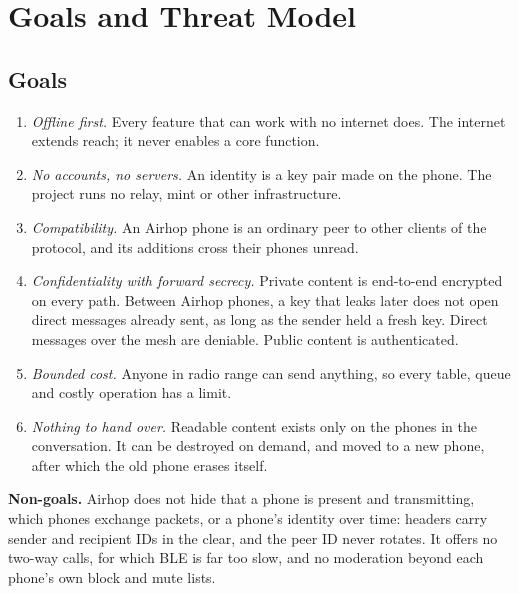 \documentclass[conference]{IEEEtran}
\begin{document}
\section{Goals and Threat Model}
\label{sec:goals}

\subsection{Goals}
{\renewcommand{\labelenumi}{G\arabic{enumi}.}
\begin{enumerate}
\item \emph{Offline first.} Every feature that can work with no internet does. The internet extends reach; it never enables a core function.
\item \emph{No accounts, no servers.} An identity is a key pair made on the phone. The project runs no relay, mint or other infrastructure.
\item \emph{Compatibility.} An Airhop phone is an ordinary peer to other clients of the protocol, and its additions cross their phones unread.
\item \emph{Confidentiality with forward secrecy.} Private content is end-to-end encrypted on every path. Between Airhop phones, a key that leaks later does not open direct messages already sent, as long as the sender held a fresh key. Direct messages over the mesh are deniable. Public content is authenticated.
\item \emph{Bounded cost.} Anyone in radio range can send anything, so every table, queue and costly operation has a limit.
\item \emph{Nothing to hand over.} Readable content exists only on the phones in the conversation. It can be destroyed on demand, and moved to a new phone, after which the old phone erases itself.
\end{enumerate}}

\textbf{Non-goals.} Airhop does not hide that a phone is present and transmitting, which phones exchange packets, or a phone's identity over time: headers carry sender and recipient IDs in the clear, and the peer ID never rotates. It offers no two-way calls, for which BLE is far too slow, and no moderation beyond each phone's own block and mute lists.
\end{document}
